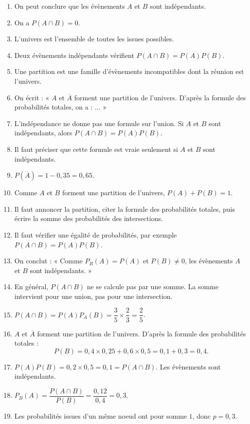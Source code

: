 \documentclass[11pt,a4paper]{article}
\newcounter{reponse}
\newenvironment{blocreponses}[1]{%
  \begin{tcolorbox}[enhanced,breakable,colback=bleuclair,colframe=bleufonce,boxrule=0.6pt,arc=2mm,left=2mm,right=2mm,top=2mm,bottom=1.5mm,title={\bfseries #1},coltitle=white,colbacktitle=bleufonce,before skip=3mm,after skip=3mm, fontupper=\large]
  \large
  \begin{enumerate}[leftmargin=*,label=\textbf{\arabic*.},itemsep=0.45em,topsep=0.5em]
  \setcounter{enumi}{\value{reponse}}
}{%
  \setcounter{reponse}{\value{enumi}}
  \end{enumerate}
  \end{tcolorbox}
}
\begin{document}
\begin{blocreponses}{Réponses -- Questions flash}
  \item On peut conclure que les évènements $A$ et $B$ sont indépendants.
  \item On a $P(A\cap B)=0$.
  \item L'univers est l'ensemble de toutes les issues possibles.
  \item Deux évènements indépendants vérifient $P(A\cap B)=P(A)P(B)$.
  \item Une partition est une famille d'évènements incompatibles dont la réunion est l'univers.
  \item On écrit : « $A$ et $\overline A$ forment une partition de l'univers. D'après la formule des probabilités totales, on a : ... »
  \item L'indépendance ne donne pas une formule sur l'union. Si $A$ et $B$ sont indépendants, alors $P(A\cap B)=P(A)P(B)$.
  \item Il faut préciser que cette formule est vraie seulement si $A$ et $B$ sont indépendants.
  \item $P(\overline A)=1-0{,}35=0{,}65$.
  \item Comme $A$ et $B$ forment une partition de l'univers, $P(A)+P(B)=1$.
  \item Il faut annoncer la partition, citer la formule des probabilités totales, puis écrire la somme des probabilités des intersections.
  \item Il faut vérifier une égalité de probabilités, par exemple $P(A\cap B)=P(A)P(B)$.
  \item On conclut : « Comme $P_B(A)=P(A)$ et $P(B)\neq0$, les évènements $A$ et $B$ sont indépendants. »
  \item En général, $P(A\cap B)$ ne se calcule pas par une somme. La somme intervient pour une union, pas pour une intersection.
  \item $P(A\cap B)=P(A)P_A(B)=\dfrac35\times\dfrac23=\dfrac25$.
  \item $A$ et $\overline A$ forment une partition de l'univers. D'après la formule des probabilités totales :
  \[
  P(B)=0{,}4\times0{,}25+0{,}6\times0{,}5=0{,}1+0{,}3=0{,}4.
  \]
  \item $P(A)P(B)=0{,}2\times0{,}5=0{,}1=P(A\cap B)$. Les évènements sont indépendants.
  \item $P_B(A)=\dfrac{P(A\cap B)}{P(B)}=\dfrac{0{,}12}{0{,}4}=0{,}3$.
  \item Les probabilités issues d'un même noeud ont pour somme $1$, donc $p=0{,}3$.
\end{blocreponses}
\clearpage
\end{document}
